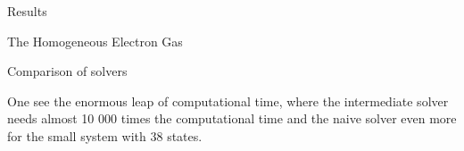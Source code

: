 \documentclass[twoside,english]{uiofysmaster}
\begin{document}
\begin{chapter}{Results}
\begin{section}{The Homogeneous Electron Gas}
\begin{subsection}{Comparison of solvers}
\begin{table}[H]
\begin{center}
				\end{center}
				\caption{Calculations on the Homogeneous electron gas, using three different implementations of CCD equations. Showing time needed for every solver to calculate results in figure (\ref{table:CompareSolversHEG}. The System has been calculated with $2$ or $14$ particles and the total states either $38$ or $54$. The calculations has been made with a relaxing factor of $0.3$ and $r_s = 1.0$. Results found in file \textit{CompareTimeNaiveBlock.txt} \cite{WholmenGithub}}
				\label{table:CompareSolversTimeHEG}
			\end{table}
			One see the enormous leap of computational time, where the intermediate solver needs almost 10 000 times the computational time and the naive solver even more for the small system with $38$ states. 
		\end{subsection}
 		

\end{section}
\end{chapter}
\end{document}
